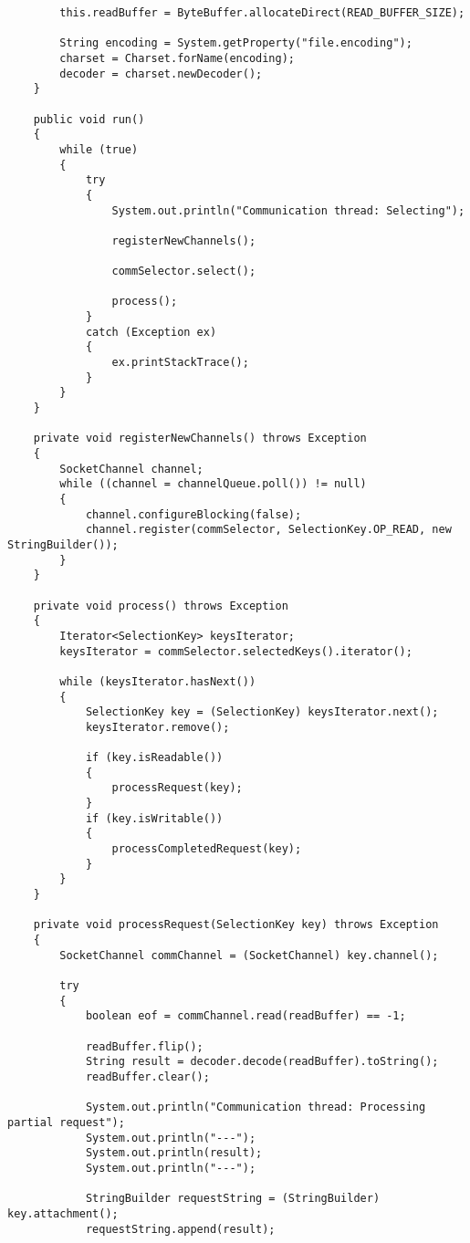 \documentclass[a4paper,10pt]{article}
\begin{document}
\begin{verbatim}
        this.readBuffer = ByteBuffer.allocateDirect(READ_BUFFER_SIZE);

        String encoding = System.getProperty("file.encoding");
        charset = Charset.forName(encoding);
        decoder = charset.newDecoder();
    }

    public void run()
    {
        while (true)
        {
            try
            {
                System.out.println("Communication thread: Selecting");

                registerNewChannels();

                commSelector.select();

                process();
            }
            catch (Exception ex)
            {
                ex.printStackTrace();
            }
        }
    }

    private void registerNewChannels() throws Exception
    {
        SocketChannel channel;
        while ((channel = channelQueue.poll()) != null)
        {
            channel.configureBlocking(false);
            channel.register(commSelector, SelectionKey.OP_READ, new StringBuilder());
        }
    }

    private void process() throws Exception
    {
        Iterator<SelectionKey> keysIterator;
        keysIterator = commSelector.selectedKeys().iterator();

        while (keysIterator.hasNext())
        {
            SelectionKey key = (SelectionKey) keysIterator.next();
            keysIterator.remove();

            if (key.isReadable())
            {
                processRequest(key);
            }
            if (key.isWritable())
            {
                processCompletedRequest(key);
            }
        }
    }

    private void processRequest(SelectionKey key) throws Exception
    {
        SocketChannel commChannel = (SocketChannel) key.channel();

        try
        {
            boolean eof = commChannel.read(readBuffer) == -1;

            readBuffer.flip();
            String result = decoder.decode(readBuffer).toString();
            readBuffer.clear();

            System.out.println("Communication thread: Processing partial request");
            System.out.println("---");
            System.out.println(result);
            System.out.println("---");

            StringBuilder requestString = (StringBuilder) key.attachment();
            requestString.append(result);


\end{verbatim}
\end{document}
